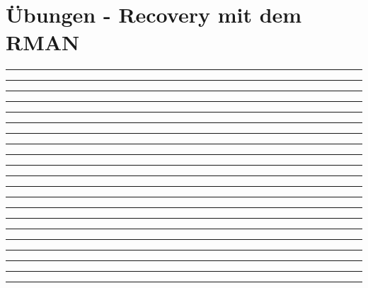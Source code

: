 \section{\"Ubungen - Recovery mit dem RMAN}
  \begin{enumerate}
    

      \rule{0.94\textwidth}{0.5pt}

      \rule{0.94\textwidth}{0.5pt}

      \rule{0.94\textwidth}{0.5pt}

      \rule{0.94\textwidth}{0.5pt}

    
    
    
    

      \rule{0.94\textwidth}{0.5pt}

      \rule{0.94\textwidth}{0.5pt}

      \rule{0.94\textwidth}{0.5pt}

      \rule{0.94\textwidth}{0.5pt}
\clearpage
    

      \rule{0.94\textwidth}{0.5pt}

      \rule{0.94\textwidth}{0.5pt}

      \rule{0.94\textwidth}{0.5pt}

      \rule{0.94\textwidth}{0.5pt}

    

      \rule{0.94\textwidth}{0.5pt}

      \rule{0.94\textwidth}{0.5pt}

      \rule{0.94\textwidth}{0.5pt}

    

      \rule{0.94\textwidth}{0.5pt}

      \rule{0.94\textwidth}{0.5pt}

      \rule{0.94\textwidth}{0.5pt}


    
    
    

      \rule{0.94\textwidth}{0.5pt}

      \rule{0.94\textwidth}{0.5pt}

      \rule{0.94\textwidth}{0.5pt}

    
  \end{enumerate}
\clearpage